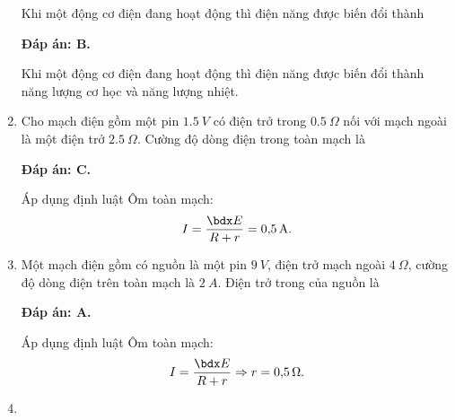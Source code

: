 \begin{enumerate}[label=\bfseries Câu \arabic*:]
	\cauhoi
	{Khi một động cơ điện đang hoạt động thì điện năng được biến đổi thành
		
	}
	\loigiai
	{	\textbf{Đáp án: B.}
		
		Khi một động cơ điện đang hoạt động thì điện năng được biến đổi thành năng lượng cơ học và năng lượng nhiệt.
	}
	\item {}
	
	\cauhoi
	{Cho mạch điện gồm một pin $\SI{1.5}{V}$ có điện trở trong $\SI{0.5}{\Omega}$ nối với mạch ngoài là một điện trở $\SI{2.5}{\Omega}$. Cường độ dòng điện trong toàn mạch là
		
	}
	\loigiai
	{	\textbf{Đáp án: C.}
		
		Áp dụng định luật Ôm toàn mạch:
		$$I=\dfrac{\calE}{R + r} = \SI{0.5}{A}.$$
	}
	\item {}
	
	\cauhoi
	{Một mạch điện gồm có nguồn là một pin $\SI{9}{V}$, điện trở mạch ngoài $\SI{4}{\Omega}$, cường độ dòng điện trên toàn mạch là $\SI{2}{A}$. Điện trở trong của nguồn là
		
	}
	\loigiai
	{	\textbf{Đáp án: A.}
		
		Áp dụng định luật Ôm toàn mạch:
		$$I=\dfrac{\calE}{R + r} \Rightarrow r = \SI{0.5}{\Omega}.$$
	}
	\item {}
	

\end{enumerate}

